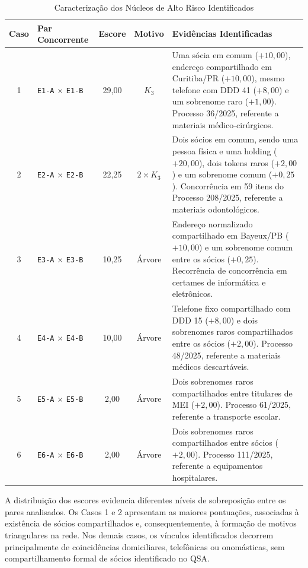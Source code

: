 \begin{table}[!t]
  \centering
  \caption{Caracterização dos Núcleos de Alto Risco Identificados}
  \label{tab:analise_nucleos}
  \footnotesize
  \begin{tabular}{clccp{8.0cm}}
    \hline
    \textbf{Caso} & \textbf{Par Concorrente} & \textbf{Escore} & \textbf{Motivo} & \textbf{Evidências Identificadas} \\
    \hline
    1 & \texttt{E1-A} $\times$ \texttt{E1-B} & 29,00 & $K_3$ & Uma sócia em comum ($+10{,}00$), endereço compartilhado em Curitiba/PR ($+10{,}00$), mesmo telefone com DDD 41 ($+8{,}00$) e um sobrenome raro ($+1{,}00$). Processo 36/2025, referente a materiais médico-cirúrgicos. \\
    2 & \texttt{E2-A} $\times$ \texttt{E2-B} & 22,25 & $2 \times K_3$ & Dois sócios em comum, sendo uma pessoa física e uma holding ($+20{,}00$), dois tokens raros ($+2{,}00$) e um sobrenome comum ($+0{,}25$). Concorrência em 59 itens do Processo 208/2025, referente a materiais odontológicos. \\
    3 & \texttt{E3-A} $\times$ \texttt{E3-B} & 10,25 & Árvore & Endereço normalizado compartilhado em Bayeux/PB ($+10{,}00$) e um sobrenome comum entre os sócios ($+0{,}25$). Recorrência de concorrência em certames de informática e eletrônicos. \\
    4 & \texttt{E4-A} $\times$ \texttt{E4-B} & 10,00 & Árvore & Telefone fixo compartilhado com DDD 15 ($+8{,}00$) e dois sobrenomes raros compartilhados entre os sócios ($+2{,}00$). Processo 48/2025, referente a materiais médicos descartáveis. \\
    5 & \texttt{E5-A} $\times$ \texttt{E5-B} & 2,00 & Árvore & Dois sobrenomes raros compartilhados entre titulares de MEI ($+2{,}00$). Processo 61/2025, referente a transporte escolar. \\
    6 & \texttt{E6-A} $\times$ \texttt{E6-B} & 2,00 & Árvore & Dois sobrenomes raros compartilhados entre sócios ($+2{,}00$). Processo 111/2025, referente a equipamentos hospitalares. \\
    \hline
  \end{tabular}
\end{table}

A distribuição dos escores evidencia diferentes níveis de sobreposição entre os pares analisados. Os Casos 1 e 2 apresentam as maiores pontuações, associadas à existência de sócios compartilhados e, consequentemente, à formação de motivos triangulares na rede. Nos demais casos, os vínculos identificados decorrem principalmente de coincidências domiciliares, telefônicas ou onomásticas, sem compartilhamento
formal de sócios identificado no QSA.


